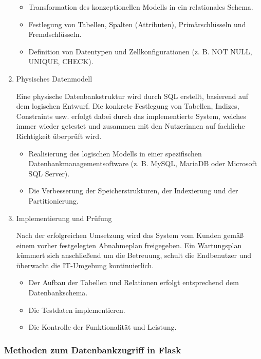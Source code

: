 \begin{enumerate}
\begin{itemize}
\item Transformation des konzeptionellen Modells in ein relationales Schema.
\item Festlegung von Tabellen, Spalten (Attributen), Primärschlüsseln und Fremdschlüsseln.
\item Definition von Datentypen und Zellkonfigurationen (z. B. NOT NULL, UNIQUE, CHECK).
\end{itemize}

\item
Physisches Datenmodell

Eine physische Datenbankstruktur wird durch \ac{SQL} erstellt, basierend auf dem logischen Entwurf.
Die konkrete Festlegung von Tabellen, Indizes, Constraints usw. erfolgt dabei durch das implementierte System, welches immer wieder getestet und zusammen mit den Nutzerinnen auf fachliche Richtigkeit überprüft wird.
\begin{itemize}

\item Realisierung des logischen Modells in einer spezifischen Datenbankmanagementsoftware (z. B. MySQL, MariaDB oder Microsoft SQL Server).
\item Die Verbesserung der Speicherstrukturen, der Indexierung und der Partitionierung.

\end{itemize}

\item
Implementierung und Prüfung

Nach der erfolgreichen Umsetzung wird das System vom Kunden gemäß einem vorher festgelegten Abnahmeplan freigegeben.
Ein Wartungsplan kümmert sich anschließend um die Betreuung, schult die Endbenutzer und überwacht die IT-Umgebung kontinuierlich.


\begin{itemize}

\item Der Aufbau der Tabellen und Relationen erfolgt entsprechend dem Datenbankschema.

\item Die Testdaten implementieren.

\item Die Kontrolle der Funktionalität und Leistung.

\end{itemize}

\end{enumerate}


\subsubsection{Methoden zum Datenbankzugriff in Flask}

